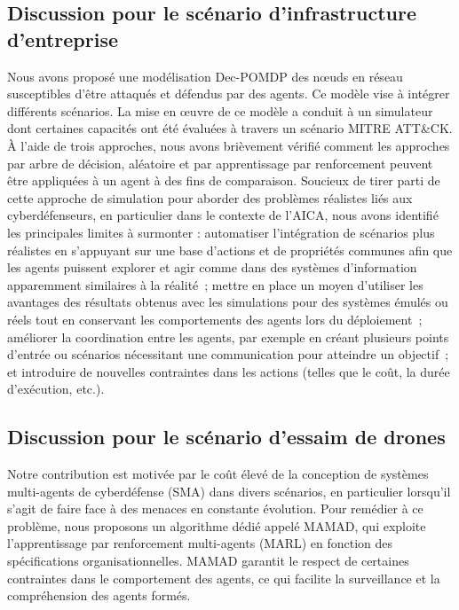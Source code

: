 \subsection{Discussion pour le scénario d'infrastructure d'entreprise}

\noindent Nous avons proposé une modélisation Dec-POMDP des nœuds en réseau susceptibles d'être attaqués et défendus par des agents. Ce modèle vise à intégrer différents scénarios. La mise en œuvre de ce modèle a conduit à un simulateur dont certaines capacités ont été évaluées à travers un scénario MITRE ATT\&CK. À l'aide de trois approches, nous avons brièvement vérifié comment les approches par arbre de décision, aléatoire et par apprentissage par renforcement peuvent être appliquées à un agent à des fins de comparaison.
Soucieux de tirer parti de cette approche de simulation pour aborder des problèmes réalistes liés aux cyberdéfenseurs, en particulier dans le contexte de l'AICA, nous avons identifié les principales limites à surmonter :
automatiser l'intégration de scénarios plus réalistes en s'appuyant sur une base d'actions et de propriétés communes afin que les agents puissent explorer et agir comme dans des systèmes d'information apparemment similaires à la réalité~;
mettre en place un moyen d'utiliser les avantages des résultats obtenus avec les simulations pour des systèmes émulés ou réels tout en conservant les comportements des agents lors du déploiement~;
améliorer la coordination entre les agents, par exemple en créant plusieurs points d'entrée ou scénarios nécessitant une communication pour atteindre un objectif~;
et introduire de nouvelles contraintes dans les actions (telles que le coût, la durée d'exécution, etc.).


\subsection{Discussion pour le scénario d'essaim de drones}\label{sec:conclusion}

Notre contribution est motivée par le coût élevé de la conception de systèmes multi-agents de cyberdéfense (SMA) dans divers scénarios, en particulier lorsqu'il s'agit de faire face à des menaces en constante évolution. Pour remédier à ce problème, nous proposons un algorithme dédié appelé MAMAD, qui exploite l'apprentissage par renforcement multi-agents (MARL) en fonction des spécifications organisationnelles. MAMAD garantit le respect de certaines contraintes dans le comportement des agents, ce qui facilite la surveillance et la compréhension des agents formés.

